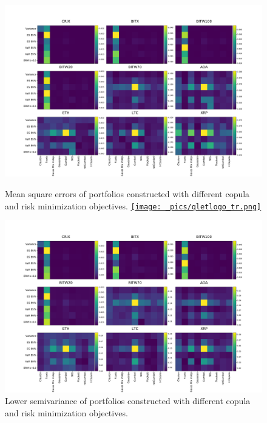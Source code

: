 \newpage
\begin{figure}[!]
        \centering
        \includegraphics[width=\textwidth]{_pics/MSE_other.pdf}
      \caption{Mean square errors of portfolios constructed with different copula and risk minimization objectives.
      \href{http://www.quantlet.com/}{\texttt{[image: \_pics/qletlogo\_tr.png]}} }
    \label{fig:MSE_other}

        \centering
        \includegraphics[width=\textwidth]{_pics/semiLowerVariance_other.pdf}
      \caption{Lower semivariance of portfolios constructed with different copula and risk minimization objectives.
  }
    \label{fig:SLV_other}
\end{figure}
\clearpage

